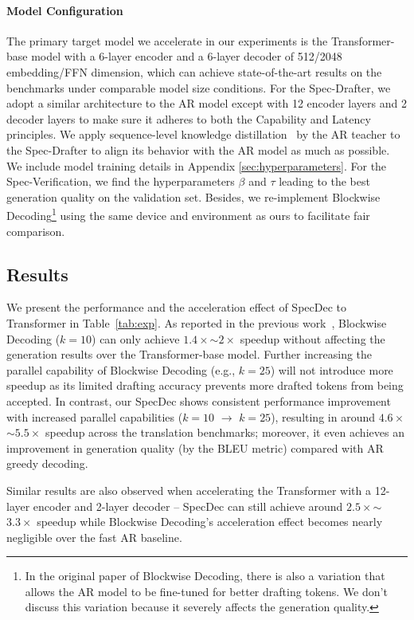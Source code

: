 \paragraph{Model Configuration} The primary target model we accelerate in our experiments is the Transformer-base model with a 6-layer encoder and a 6-layer decoder of 512/2048 embedding/FFN dimension, which can achieve state-of-the-art results on the benchmarks under comparable model size conditions. For the Spec-Drafter, we adopt a similar architecture to the AR model except with 12 encoder layers and 2 decoder layers to make sure it adheres to both the Capability and Latency principles. We apply sequence-level knowledge distillation~\cite{kim2016sequence} by the AR teacher to the Spec-Drafter to align its behavior with the AR model as much as possible. We include model training details in Appendix \ref{sec:hyperparameters}. For the Spec-Verification, we find the hyperparameters $\beta$ and $\tau$ leading to the best generation quality on the validation set. Besides, we re-implement Blockwise Decoding\footnote{In the original paper of Blockwise Decoding, there is also a variation that allows the AR model to be fine-tuned for better drafting tokens. We don't discuss this variation because it severely affects the generation quality.} using the same device and environment as ours to facilitate fair comparison.

\subsection{Results}\label{subsec: result} We present the performance and the acceleration effect of SpecDec to Transformer in Table~\ref{tab:exp}. As reported in the previous work~\cite{Stern:2018blockwise}, Blockwise Decoding ($k=10$) can only achieve $1.4\times$$\sim$$2\times$ speedup without affecting the generation results over the Transformer-base model. Further increasing the parallel capability of Blockwise Decoding (e.g., $k=25$) will not introduce more speedup as its limited drafting accuracy prevents more drafted tokens from being accepted. In contrast, our SpecDec shows consistent performance improvement with increased parallel capabilities ($k=10$ $\rightarrow$ $k=25$), resulting in around $4.6\times$$\sim$$5.5\times$ speedup across the translation benchmarks; moreover, it even achieves an improvement in generation quality (by the BLEU metric) compared with AR greedy decoding. 

Similar results are also observed when accelerating the Transformer with a 12-layer encoder and 2-layer decoder -- SpecDec can still achieve around $2.5\times$$\sim$$3.3\times$ speedup while Blockwise Decoding's acceleration effect becomes nearly negligible over the fast AR baseline.

